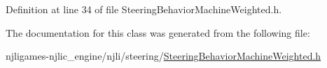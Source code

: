 Definition at line 34 of file Steering\+Behavior\+Machine\+Weighted.\+h.



The documentation for this class was generated from the following file\+:\begin{DoxyCompactItemize}
\item 
njligames-\/njlic\+\_\+engine/njli/steering/\mbox{\hyperlink{_steering_behavior_machine_weighted_8h}{Steering\+Behavior\+Machine\+Weighted.\+h}}\end{DoxyCompactItemize}
